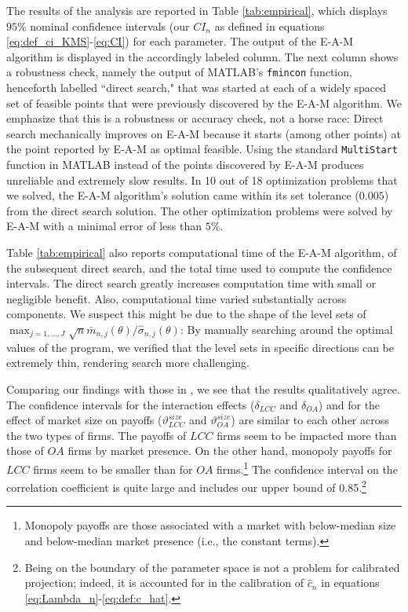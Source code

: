 \documentclass[letterpaper,11pt]{article}
\theoremstyle{myplain}
\theoremstyle{mydefinition}
\theoremstyle{myremark}
\renewcommand{\cite}{\citet}
\numberwithin{equation}{section}
\numberwithin{figure}{section}
\begin{document}
The results of the analysis are reported in Table \ref{tab:empirical}, which displays $95\%$ nominal confidence intervals (our $CI_n$ as defined in equations \eqref{eq:def_ci_KMS}-\eqref{eq:CI}) for each parameter. The output of the E-A-M algorithm is displayed in the accordingly labeled column. The next column shows a robustness check, namely the output of MATLAB's \texttt{fmincon} function, henceforth labelled ``direct search," that was started at each of a widely spaced set of feasible points that were previously discovered by the E-A-M algorithm. We emphasize that this is a robustness or accuracy check, not a horse race: Direct search mechanically improves on E-A-M because it starts (among other points) at the point reported by E-A-M as optimal feasible. Using the standard \texttt{MultiStart} function in MATLAB instead of the points discovered by E-A-M produces unreliable and extremely slow results. 
In 10 out of 18 optimization problems that we solved, the E-A-M algorithm's solution came within its set tolerance ($0.005$) from the direct search solution. The other optimization problems were solved by E-A-M with a minimal error of less than $5\%$. 

Table \ref{tab:empirical} also reports computational time of the E-A-M algorithm, of the subsequent direct search, and the total time used to compute the confidence intervals. The direct search greatly increases computation time with small or negligible benefit.
Also, computational time varied substantially across components.
We suspect this might be due to the shape of the level sets of $\max_{j=1,\dots,J}\sqrt n \bar m_{n,j}(\theta)/\hat\sigma_{n,j}(\theta)$: By manually searching around the optimal values of the program, we verified that the level sets in specific directions can be extremely thin, rendering search more challenging.

Comparing our findings with those in \cite{KT15}, we see that the results qualitatively agree.
The confidence intervals for the interaction effects ($\delta_{LCC}$ and $\delta_{OA}$) and for the effect of market size on payoffs ($\vartheta^{size}_{LCC}$ and $\vartheta^{size}_{OA}$) are similar to each other across the two types of firms. 
The payoffs of $LCC$ firms seem to be impacted more than those of $OA$ firms by market presence.
On the other hand, monopoly payoffs for $LCC$ firms seem to be smaller than for $OA$ firms.\footnote{Monopoly payoffs are those associated with a market with below-median
size and below-median market presence (i.e., the constant terms).} 
The confidence interval on the correlation coefficient is quite large and includes our upper bound of 0.85.\footnote{Being on the boundary of the parameter space is not a problem for calibrated projection; indeed, it is accounted for in the calibration of $\hat{c}_n$ in equations \eqref{eq:Lambda_n}-\eqref{eq:def:c_hat}.}
\end{document}
